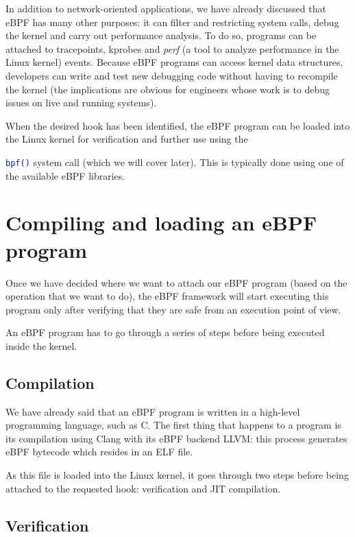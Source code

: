 In addition to network-oriented applications, we have already discussed that eBPF has many other purposes: it can filter and restricting system calls, debug the kernel and carry out performance analysis.
To do so, programs can be attached to tracepoints, kprobes and \textit{perf} (a tool to analyze performance in the Linux kernel) events.
Because eBPF programs can access kernel data structures, developers can write and test new debugging code without having to recompile the kernel (the implications are obvious for engineers whose work is to debug issues on live and running systems).

When the desired hook has been identified, the eBPF program can be loaded into the Linux kernel for verification and further use using the \raggedright\colorbox{backcolour}{\lstinline[style=commandline, language=bash]|bpf()|} system call (which we will cover later). 
This is typically done using one of the available eBPF libraries. 

\section{Compiling and loading an eBPF program}

Once we have decided where we want to attach our eBPF program (based on the operation that we want to do), the eBPF framework will start executing this program only after verifying that they are safe from an execution point of view. 

An eBPF program has to go through a series of steps before being executed inside the kernel.

\subsection{Compilation}

We have already said that an eBPF program is written in a high-level programming language, such as C.
The first thing that happens to a program is its compilation using Clang with its eBPF backend LLVM: this process generates eBPF bytecode which resides in an ELF file.

As this file is loaded into the Linux kernel, it goes through two steps before being attached to the requested hook: verification and JIT compilation.

\subsection{Verification}

